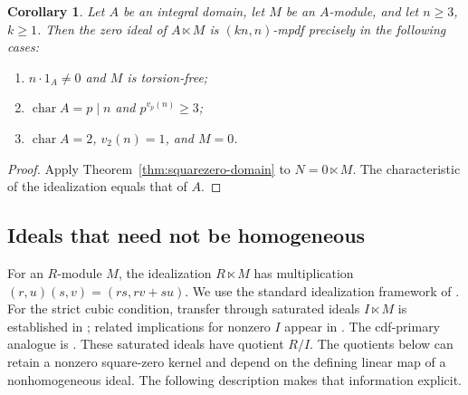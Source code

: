 \documentclass[11pt,a4paper]{amsart}
\newtheorem{corollary}[theorem]{Corollary}
\theoremstyle{definition}
\theoremstyle{remark}
\numberwithin{equation}{section}
\begin{document}
\begin{corollary}\label{cor:domain-idealization}
Let $A$ be an integral domain, let $M$ be an $A$-module, and let
$n\geq3$, $k\geq1$. Then the zero ideal of $A\ltimes M$ is $(kn,n)$-mpdf
precisely in the following cases:
\begin{enumerate}
\item $n\cdot1_A\neq0$ and $M$ is torsion-free;
\item $\operatorname{char}A=p\mid n$ and $p^{v_p(n)}\geq3$;
\item $\operatorname{char}A=2$, $v_2(n)=1$, and $M=0$.
\end{enumerate}
\end{corollary}
\begin{proof}
Apply Theorem~\ref{thm:squarezero-domain} to $N=0\ltimes M$.
The characteristic of the idealization equals that of $A$.
\end{proof}

\subsection{Ideals that need not be homogeneous}

For an $R$-module $M$, the idealization $R\ltimes M$ has multiplication
$(r,u)(s,v)=(rs,rv+su)$. We use the standard idealization framework of
\cite{AW}. For the strict cubic condition, transfer through saturated
ideals $I\ltimes M$ is established in \cite[Theorem~4.6]{Dr26};
related implications for nonzero $I$ appear in
\cite[Theorem~2.20]{Far}. The cdf-primary analogue is
\cite[Theorem~7(3)]{YSO}. These saturated ideals have quotient $R/I$.
The quotients below can retain a nonzero square-zero kernel and
depend on the defining linear map of a nonhomogeneous ideal.
The following description makes that information explicit.
\end{document}
